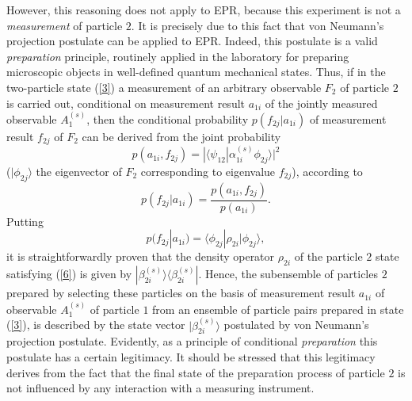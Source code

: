 \documentclass[12pt]{article}
\begin{document}
However, this reasoning does not apply to EPR, because this
experiment is not a {\em measurement} of particle $2$. It is
precisely due to this fact that von Neumann's projection postulate
can be applied to EPR. Indeed, this postulate is a valid {\em
preparation} principle, routinely applied in the laboratory for
preparing microscopic objects in well-defined quantum mechanical
states. Thus, if in the two-particle state (\ref{3}) a measurement
of an arbitrary observable $F_2$ of particle $2$ is carried out,
conditional on measurement result $a_{1i}$ of the jointly measured
observable $A_1^{(s)} $, then the conditional probability
$p(f_{2j}|a_{1i})$ of measurement result $f_{2j}$ of $F_2$ can be
derived from the joint probability
\begin{equation} p(a_{1i},f_{2j}) = |\langle\psi_{12}|
\alpha^{(s)}_{1i}\phi_{2j}\rangle|^2\label{4}
\end{equation}($|\phi_{2j}\rangle$ the eigenvector of $F_2$
corresponding to eigenvalue $f_{2j}$), according to
\begin{equation} p(f_{2j}|a_{1i}) =
\frac{p(a_{1i},f_{2j})}{p(a_{1i})}.\label{5}
\end{equation}
Putting
\begin{equation} p(f_{2j}|a_{1i})= \langle\phi_{2j}| \rho_{2i}
|\phi_{2j}\rangle,\label{6}
\end{equation}
it is straightforwardly proven that the density operator
$\rho_{2i}$ of the particle $2$ state satisfying (\ref{6}) is
given by $|\beta^{(s)}_{2i}\rangle\langle \beta^{(s)}_{2i}| $.
Hence, the subensemble of particles $2$ prepared by selecting
these particles on the basis of measurement result $a_{1i}$ of
observable $A_1^{(s)} $ of particle $1$ from an ensemble of
particle pairs prepared in state (\ref{3}), is described by the
state vector $|\beta^{(s)}_{2i}\rangle$ postulated by von
Neumann's projection postulate. Evidently, as a principle of
conditional {\em preparation} this postulate has a certain
legitimacy. It should be stressed that this legitimacy derives
from the fact that the final state of the preparation process of
particle $2$ is not influenced by any interaction with a measuring
instrument.
\end{document}
